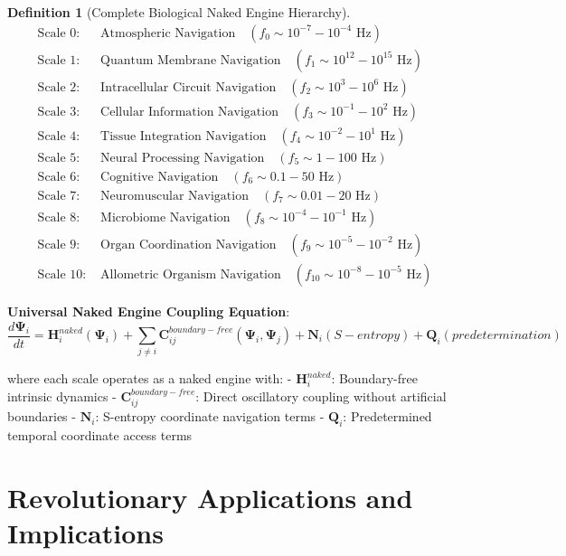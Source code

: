 \documentclass[12pt,a4paper]{article}
\newtheorem{definition}[theorem]{Definition}
\begin{document}
\begin{definition}[Complete Biological Naked Engine Hierarchy]
\begin{align}
\text{Scale 0: } &\text{Atmospheric Navigation} \quad (f_0 \sim 10^{-7}-10^{-4} \text{ Hz}) \\
\text{Scale 1: } &\text{Quantum Membrane Navigation} \quad (f_1 \sim 10^{12}-10^{15} \text{ Hz}) \\
\text{Scale 2: } &\text{Intracellular Circuit Navigation} \quad (f_2 \sim 10^3-10^6 \text{ Hz}) \\
\text{Scale 3: } &\text{Cellular Information Navigation} \quad (f_3 \sim 10^{-1}-10^2 \text{ Hz}) \\
\text{Scale 4: } &\text{Tissue Integration Navigation} \quad (f_4 \sim 10^{-2}-10^1 \text{ Hz}) \\
\text{Scale 5: } &\text{Neural Processing Navigation} \quad (f_5 \sim 1-100 \text{ Hz}) \\
\text{Scale 6: } &\text{Cognitive Navigation} \quad (f_6 \sim 0.1-50 \text{ Hz}) \\
\text{Scale 7: } &\text{Neuromuscular Navigation} \quad (f_7 \sim 0.01-20 \text{ Hz}) \\
\text{Scale 8: } &\text{Microbiome Navigation} \quad (f_8 \sim 10^{-4}-10^{-1} \text{ Hz}) \\
\text{Scale 9: } &\text{Organ Coordination Navigation} \quad (f_9 \sim 10^{-5}-10^{-2} \text{ Hz}) \\
\text{Scale 10: } &\text{Allometric Organism Navigation} \quad (f_{10} \sim 10^{-8}-10^{-5} \text{ Hz})
\end{align}
\end{definition}

\textbf{Universal Naked Engine Coupling Equation}:
\begin{equation}
\frac{d\mathbf{\Psi}_i}{dt} = \mathbf{H}_i^{naked}(\mathbf{\Psi}_i) + \sum_{j \neq i} \mathbf{C}_{ij}^{boundary-free}(\mathbf{\Psi}_i, \mathbf{\Psi}_j) + \mathbf{N}_i(S-entropy) + \mathbf{Q}_i(predetermination)
\end{equation}

where each scale operates as a naked engine with:
- $\mathbf{H}_i^{naked}$: Boundary-free intrinsic dynamics
- $\mathbf{C}_{ij}^{boundary-free}$: Direct oscillatory coupling without artificial boundaries
- $\mathbf{N}_i$: S-entropy coordinate navigation terms
- $\mathbf{Q}_i$: Predetermined temporal coordinate access terms

\section{Revolutionary Applications and Implications}
\end{document}
